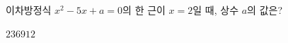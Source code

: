 이차방정식 $x^2-5x+a=0$의 한 근이 $x=2$일 때, 상수 $a$의 값은?
\begin{choices32}{$2$}{$3$}{$6$}{$9$}{$12$}\end{choices32}
